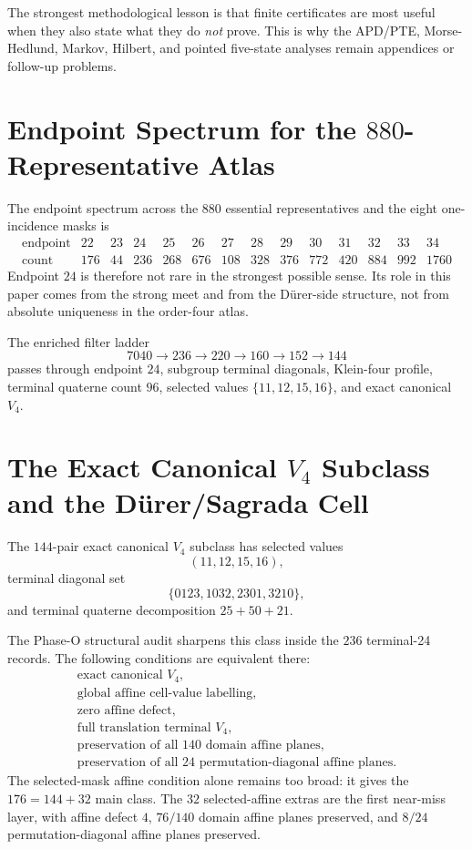 \documentclass[11pt,a4paper]{article}
\theoremstyle{definition}
\theoremstyle{remark}
\newcommand{\Durer}{D\"urer\xspace}
\begin{document}
The strongest methodological lesson is that finite certificates are most
useful when they also state what they do \emph{not} prove.  This is why the
APD/PTE, Morse-Hedlund, Markov, Hilbert, and pointed five-state analyses
remain appendices or follow-up problems.

\appendix

\section{\texorpdfstring{Endpoint Spectrum for the \(880\)-Representative Atlas}{Endpoint Spectrum for the 880-Representative Atlas}}
\label{app:endpoint-atlas}

The endpoint spectrum across the \(880\) essential representatives and the
eight one-incidence masks is
\[
\begin{array}{c|rrrrrrrrrrrrr}
\text{endpoint} & 22&23&24&25&26&27&28&29&30&31&32&33&34\\
\hline
\text{count} & 176&44&236&268&676&108&328&376&772&420&884&992&1760
\end{array}
\]
Endpoint \(24\) is therefore not rare in the strongest possible sense.  Its
role in this paper comes from the strong meet and from the \Durer-side
structure, not from absolute uniqueness in the order-four atlas.

The enriched filter ladder
\[
7040\to236\to220\to160\to152\to144
\]
passes through endpoint \(24\), subgroup terminal diagonals, Klein-four
profile, terminal quaterne count \(96\), selected values
\(\{11,12,15,16\}\), and exact canonical \(V_4\).

\section{\texorpdfstring{The Exact Canonical \(V_4\) Subclass and the \Durer/Sagrada Cell}{The Exact Canonical V4 Subclass and the Durer/Sagrada Cell}}
\label{app:v4-subclass}

The \(144\)-pair exact canonical \(V_4\) subclass has selected values
\[
(11,12,15,16),
\]
terminal diagonal set
\[
\{0123,1032,2301,3210\},
\]
and terminal quaterne decomposition \(25+50+21\).

The Phase-O structural audit sharpens this class inside the \(236\)
terminal-24 records.  The following conditions are equivalent there:
\[
\begin{gathered}
\text{exact canonical }V_4,\\
\text{global affine cell-value labelling},\\
\text{zero affine defect},\\
\text{full translation terminal }V_4,\\
\text{preservation of all }140\text{ domain affine planes},\\
\text{preservation of all }24\text{ permutation-diagonal affine planes}.
\end{gathered}
\]
The selected-mask affine condition alone remains too broad: it gives the
\(176=144+32\) main class.  The \(32\) selected-affine extras are the first
near-miss layer, with affine defect \(4\), \(76/140\) domain affine planes
preserved, and \(8/24\) permutation-diagonal affine planes preserved.
\end{document}

